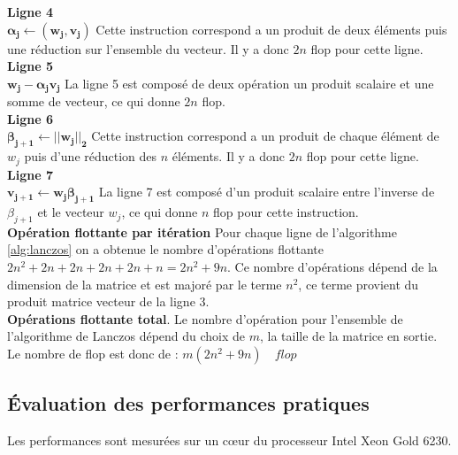 \documentclass[11pt,french]{article}
\begin{document}
	\noindent \textbf{Ligne  4}\\
	$\boldsymbol {\alpha_j \gets (w_j,v_j)}$
	Cette instruction correspond a un produit de deux éléments puis une réduction sur l'ensemble du vecteur. Il y a donc $2n$ flop pour cette ligne. \\
	
	\noindent\textbf{Ligne  5}\\
	$\boldsymbol {w_j - \boldsymbol{\alpha_j} v_j}$
	La ligne 5 est composé de deux  opération un produit scalaire et une somme de vecteur, ce qui donne $2n$ flop. \\
	
	\noindent\textbf{Ligne  6}\\
	$\boldsymbol {\beta_{j+1} \gets || w_j||_2}$
	Cette instruction correspond a un produit de chaque élément de $w_j$ puis d'une réduction des $n$ éléments. Il y a donc $2n$ flop pour cette ligne.  \\
	
	\noindent\textbf{Ligne  7}\\
	$\boldsymbol {v_{j+1} \gets w_j \beta_{j+1}}$
	La ligne 7 est composé d'un produit scalaire entre l’inverse de $\beta_{j+1}$ et le vecteur $w_j$, ce qui donne $n$ flop pour cette instruction. \\ 
	
	\noindent\textbf{Opération flottante par itération}
	Pour chaque ligne de l'algorithme \ref{alg:lanczos} on a obtenue le nombre d’opérations flottante  $2n^2 + 2n + 2n +2n +2n +n = 2n^2 + 9n$. Ce nombre d’opérations dépend de la dimension de la matrice et est majoré par le terme $n^2$, ce terme provient du produit matrice vecteur de la ligne 3. \\
	
	\noindent \textbf{Opérations flottante total}. Le nombre d’opération pour l'ensemble de l'algorithme de Lanczos dépend du choix de $m$, la taille de la matrice en sortie.\\ 
	Le nombre de flop est donc de : $  m(2n^2 + 9n) \quad flop $
	
	\subsection{Évaluation des performances pratiques}
	Les performances sont mesurées sur un cœur du processeur Intel Xeon Gold 6230.
\end{document}

